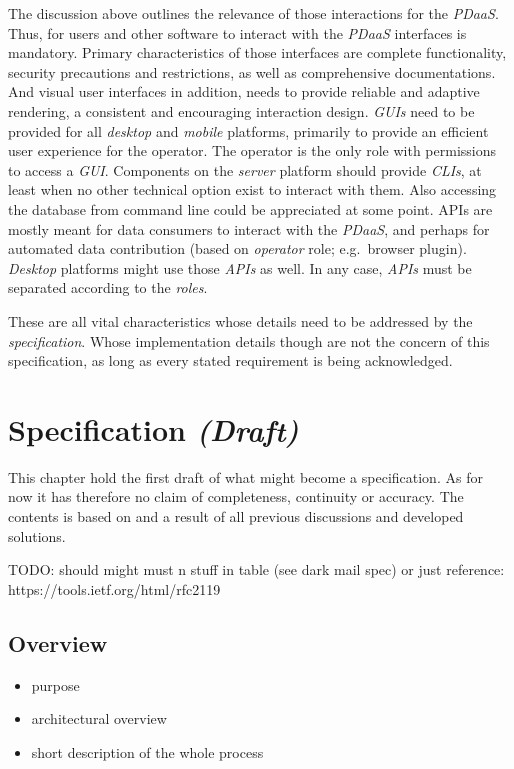 \documentclass[12pt,english,a4paper,titlepage,cleardoublepage=empty,dottedtoc]{report}
\providecommand{\tightlist}{%
  \setlength{\itemsep}{0pt}\setlength{\parskip}{0pt}}
\begin{document}
The discussion above outlines the relevance of those interactions for
the \emph{PDaaS}. Thus, for users and other software to interact with
the \emph{PDaaS} interfaces is mandatory. Primary characteristics of
those interfaces are complete functionality, security precautions and
restrictions, as well as comprehensive documentations. And visual user
interfaces in addition, needs to provide reliable and adaptive
rendering, a consistent and encouraging interaction design. \emph{GUIs}
need to be provided for all \emph{desktop} and \emph{mobile} platforms,
primarily to provide an efficient user experience for the operator. The
operator is the only role with permissions to access a \emph{GUI}.
Components on the \emph{server} platform should provide \emph{CLIs}, at
least when no other technical option exist to interact with them. Also
accessing the database from command line could be appreciated at some
point. APIs are mostly meant for data consumers to interact with the
\emph{PDaaS}, and perhaps for automated data contribution (based on
\emph{operator} role; e.g.~browser plugin). \emph{Desktop} platforms
might use those \emph{APIs} as well. In any case, \emph{APIs} must be
separated according to the \emph{roles}.

These are all vital characteristics whose details need to be addressed
by the \emph{specification}. Whose implementation details though are not
the concern of this specification, as long as every stated requirement
is being acknowledged.

\chapter{\texorpdfstring{Specification
\emph{(Draft)}}{Specification (Draft)}}\label{specification-draft}

This chapter hold the first draft of what might become a specification.
As for now it has therefore no claim of completeness, continuity or
accuracy. The contents is based on and a result of all previous
discussions and developed solutions.

TODO: should might must n stuff in table (see dark mail spec) or just
reference: https://tools.ietf.org/html/rfc2119

\section{Overview}\label{overview}

\begin{itemize}
\tightlist
\item
  purpose
\item
  architectural overview
\item
  short description of the whole process
\end{itemize}
\end{document}
